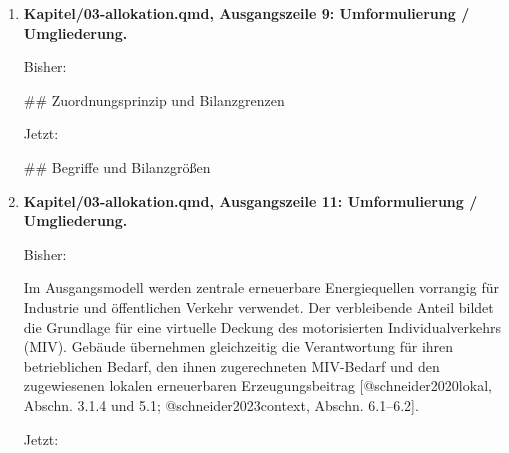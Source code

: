 \documentclass[
  ngerman,
  a4paper,
  DIV=11]{scrreprt}
\newenvironment{Shaded}{\begin{snugshade}}{\end{snugshade}}
\newcommand{\NormalTok}[1]{\textcolor[rgb]{0.00,0.23,0.31}{#1}}
\begin{document}
\begin{enumerate}
  Jetzt:

\begin{Shaded}
\begin{Highlighting}[]
\NormalTok{Die Allokation verteilt die Stromerzeugung und den Bedarf aus UBA Transition 2040 auf sektorale Verantwortungsbereiche. Sie liefert zwei verbundene Größen: den Zielsaldo für Gebäude einschließlich MIV und das aus zentraler Erzeugung zugeordnete Mobilitätsbudget. Die Rechnung ist in @sec{-}allokation{-}notebook dokumentiert.}
\end{Highlighting}
\end{Shaded}
\item
  \textbf{Kapitel/03-allokation.qmd, Ausgangszeile 9: Umformulierung /
  Umgliederung.}

  Bisher:

\begin{Shaded}
\begin{Highlighting}[]
\NormalTok{\#\# Zuordnungsprinzip und Bilanzgrenzen}
\end{Highlighting}
\end{Shaded}

  Jetzt:

\begin{Shaded}
\begin{Highlighting}[]
\NormalTok{\#\# Begriffe und Bilanzgrößen}
\end{Highlighting}
\end{Shaded}
\item
  \textbf{Kapitel/03-allokation.qmd, Ausgangszeile 11: Umformulierung /
  Umgliederung.}

  Bisher:

\begin{Shaded}
\begin{Highlighting}[]
\NormalTok{Im Ausgangsmodell werden zentrale erneuerbare Energiequellen vorrangig für Industrie und öffentlichen Verkehr verwendet. Der verbleibende Anteil bildet die Grundlage für eine virtuelle Deckung des motorisierten Individualverkehrs (MIV). Gebäude übernehmen gleichzeitig die Verantwortung für ihren betrieblichen Bedarf, den ihnen zugerechneten MIV{-}Bedarf und den zugewiesenen lokalen erneuerbaren Erzeugungsbeitrag [@schneider2020lokal, Abschn. 3.1.4 und 5.1; @schneider2023context, Abschn. 6.1–6.2].}
\end{Highlighting}
\end{Shaded}

  Jetzt:


\end{enumerate}
\end{document}
